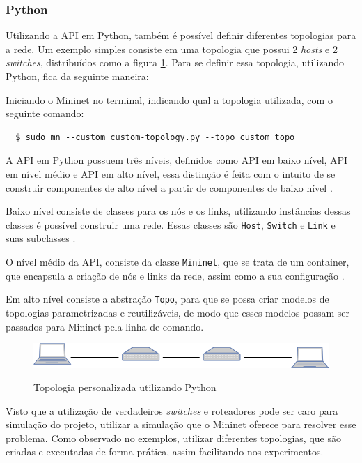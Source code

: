 \documentclass[
    12pt,
    openright, 
    oneside,
    a4paper,
    french,
    english,
    brazil
    ]{facom-ufu-abntex2}
\theoremstyle{definition}
\begin{document}
\subsubsection{Python}
Utilizando a API em Python, também é possível definir diferentes topologias para a rede. Um
exemplo simples consiste em uma topologia que possui 2 \emph{hosts} e 2 \emph{switches}, distribuídos como
a figura \ref{fig:custom-topology-example}. Para se definir essa topologia, utilizando
Python, fica da seguinte maneira:



Iniciando o Mininet no terminal, indicando qual a topologia utilizada, com o seguinte comando:

\begin{verbatim}
  $ sudo mn --custom custom-topology.py --topo custom_topo
\end{verbatim}

A API em Python possuem três níveis, definidos como API em baixo nível, API em nível médio e API
em alto nível, essa distinção é feita com o intuito de se construir componentes de alto nível
a partir de componentes de baixo nível \cite{mininetDocs}.

Baixo nível consiste de classes para os nós e os links, utilizando instâncias dessas 
classes é possível construir uma rede. Essas classes são \texttt{Host}, \texttt{Switch} e
\texttt{Link} e suas subclasses \cite{mininetDocs}.

O nível médio da API, consiste da classe \texttt{Mininet}, que se trata de um container,
que encapsula a criação de nós e links da rede, assim como a sua configuração \cite{mininetDocs}.

Em alto nível consiste a abstração \texttt{Topo}, para que se possa criar modelos de topologias 
parametrizadas e reutilizáveis, de modo que esses modelos possam ser passados para Mininet
pela linha de comando.

\begin{figure}[ht]
    \caption{Topologia personalizada utilizando Python}
    \centering
    \includegraphics[width=\textwidth]{images/2sw-2host.png}
    \label{fig:custom-topology-example}
\end{figure}

Visto que a utilização de verdadeiros \emph{switches} e roteadores pode ser caro para simulação do
projeto, utilizar a simulação que o Mininet oferece para resolver esse problema.
Como observado no exemplos, utilizar diferentes topologias, que são criadas e 
executadas de forma prática, assim facilitando nos experimentos.
\end{document}
